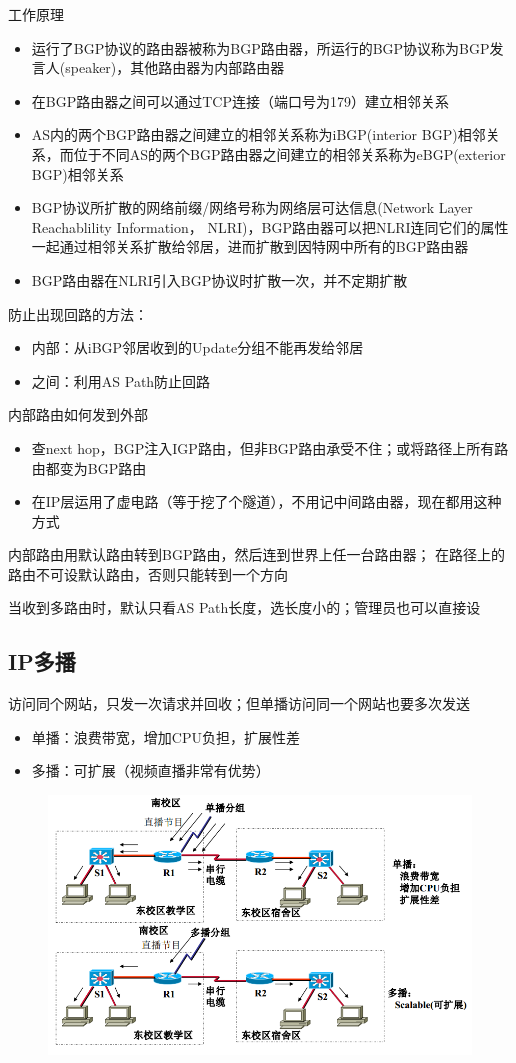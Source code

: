 工作原理
\begin{itemize}
\item 运行了BGP协议的路由器被称为BGP路由器，所运行的BGP协议称为BGP发言人(speaker)，其他路由器为内部路由器
\item 在BGP路由器之间可以通过TCP连接（端口号为179）建立相邻关系
\item AS内的两个BGP路由器之间建立的相邻关系称为iBGP(interior BGP)相邻关系，而位于不同AS的两个BGP路由器之间建立的相邻关系称为eBGP(exterior BGP)相邻关系
\item  BGP协议所扩散的网络前缀/网络号称为网络层可达信息(Network Layer Reachablility Information， NLRI)，BGP路由器可以把NLRI连同它们的属性一起通过相邻关系扩散给邻居，进而扩散到因特网中所有的BGP路由器
\item BGP路由器在NLRI引入BGP协议时扩散一次，并不定期扩散
\end{itemize}

防止出现回路的方法：
\begin{itemize}
\item 内部：从iBGP邻居收到的Update分组不能再发给邻居
\item 之间：利用AS Path防止回路
\end{itemize}

内部路由如何发到外部
\begin{itemize}
\item 查next hop，BGP注入IGP路由，但非BGP路由承受不住；或将路径上所有路由都变为BGP路由
\item 在IP层运用了虚电路（等于挖了个隧道），不用记中间路由器，现在都用这种方式
\end{itemize}

内部路由用默认路由转到BGP路由，然后连到世界上任一台路由器；
在路径上的路由不可设默认路由，否则只能转到一个方向

当收到多路由时，默认只看AS Path长度，选长度小的；管理员也可以直接设

\subsection{IP多播}
访问同个网站，只发一次请求并回收；但单播访问同一个网站也要多次发送
\begin{itemize}
\item 单播：浪费带宽，增加CPU负担，扩展性差
\item 多播：可扩展（视频直播非常有优势）
\end{itemize}
\begin{figure}[H]
	\centering
	\includegraphics[width=0.8\linewidth]{fig/multicast.png}
\end{figure}

